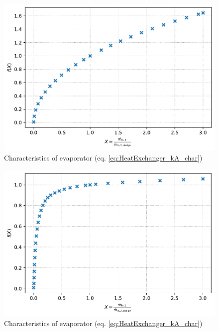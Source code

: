 \begin{minipage}{0.5\textwidth}
\begin{figure}[H]\begin{center}
\includegraphics[width=\textwidth]{figures/HeatExchanger_CharLine_kA_char1_evaporator.pdf}
\caption{Characteristics of evaporator (eq. \ref{eq:HeatExchanger_kA_char})}
\label{fig:CharLine_kA_char1_evaporator}
\end{center}\end{figure}

\end{minipage}
\begin{minipage}{0.5\textwidth}
\begin{figure}[H]\begin{center}
\includegraphics[width=\textwidth]{figures/HeatExchanger_CharLine_kA_char2_evaporator.pdf}
\caption{Characteristics of evaporator (eq. \ref{eq:HeatExchanger_kA_char})}
\label{fig:CharLine_kA_char2_evaporator}
\end{center}\end{figure}

\end{minipage}

